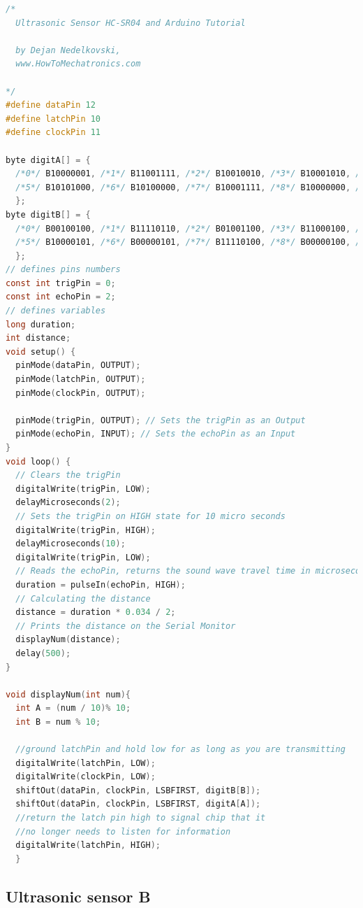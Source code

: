   \begin{lstlisting}[language=c,caption={Sensor testing code A},label={lst:sensor_test_a}]
/*
  Ultrasonic Sensor HC-SR04 and Arduino Tutorial

  by Dejan Nedelkovski,
  www.HowToMechatronics.com

*/
#define dataPin 12
#define latchPin 10
#define clockPin 11

byte digitA[] = {
  /*0*/ B10000001, /*1*/ B11001111, /*2*/ B10010010, /*3*/ B10001010, /*4*/ B11001100,
  /*5*/ B10101000, /*6*/ B10100000, /*7*/ B10001111, /*8*/ B10000000, /*9*/ B10001000,
  };
byte digitB[] = {
  /*0*/ B00100100, /*1*/ B11110110, /*2*/ B01001100, /*3*/ B11000100, /*4*/ B10010110,
  /*5*/ B10000101, /*6*/ B00000101, /*7*/ B11110100, /*8*/ B00000100, /*9*/ B10000100
  };
// defines pins numbers
const int trigPin = 0;
const int echoPin = 2;
// defines variables
long duration;
int distance;
void setup() {
  pinMode(dataPin, OUTPUT);
  pinMode(latchPin, OUTPUT);
  pinMode(clockPin, OUTPUT);
  
  pinMode(trigPin, OUTPUT); // Sets the trigPin as an Output
  pinMode(echoPin, INPUT); // Sets the echoPin as an Input
}
void loop() {
  // Clears the trigPin
  digitalWrite(trigPin, LOW);
  delayMicroseconds(2);
  // Sets the trigPin on HIGH state for 10 micro seconds
  digitalWrite(trigPin, HIGH);
  delayMicroseconds(10);
  digitalWrite(trigPin, LOW);
  // Reads the echoPin, returns the sound wave travel time in microseconds
  duration = pulseIn(echoPin, HIGH);
  // Calculating the distance
  distance = duration * 0.034 / 2;
  // Prints the distance on the Serial Monitor
  displayNum(distance);
  delay(500);
}

void displayNum(int num){
  int A = (num / 10)% 10; 
  int B = num % 10;

  //ground latchPin and hold low for as long as you are transmitting
  digitalWrite(latchPin, LOW);
  digitalWrite(clockPin, LOW);
  shiftOut(dataPin, clockPin, LSBFIRST, digitB[B]);
  shiftOut(dataPin, clockPin, LSBFIRST, digitA[A]);
  //return the latch pin high to signal chip that it
  //no longer needs to listen for information
  digitalWrite(latchPin, HIGH);
  }
\end{lstlisting}

\subsection*{Ultrasonic sensor B}

